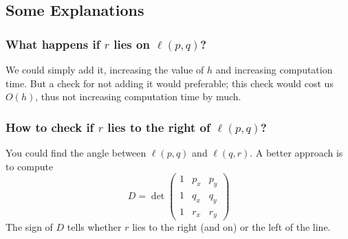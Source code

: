 \documentclass[12pt]{article}
\begin{document}
\subsection*{Some Explanations}
\subsubsection*{What happens if $r$ lies on $\ell(p,q)$?}
We could simply add it, increasing the value of $h$ and increasing computation time. But a check for not adding it would preferable; this check would cost us $O(h)$, thus not increasing computation time by much.

\subsubsection*{How to check if $r$ lies to the right of $\ell(p,q)$?}
You could find the angle between $\ell(p,q)$ and $\ell(q,r)$. A better approach is to compute
\[
    D = \det \begin{pmatrix}
        1 & p_{x} & p_{y} \\
        1 & q_{x} & q_{y} \\
        1 & r_{x} & r_{y}
    \end{pmatrix}
\]
The sign of $D$ tells whether $r$ lies to the right (and on) or the left of the line.
\end{document}
